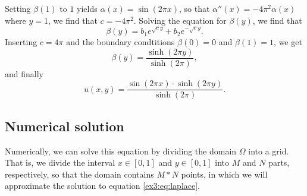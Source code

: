 Setting $\beta(1)$ to $1$ yields $\alpha(x) = \sin(2\pi x)$, so that $\alpha''(x) = -4\pi^2\alpha(x)$ where $y = 1$, we find that $c = -4\pi^2$.
Solving the equation for $\beta(y)$, we find that
\begin{equation*}
    \beta(y) = b_1 e^{\sqrt{c} y} + b_2 e^{-\sqrt{c} y}.
\end{equation*}
Inserting $c = 4\pi$ and the boundary condtitions $\beta(0) = 0$ and $\beta(1) = 1$, we get
\begin{equation*}
    \beta(y) = \frac{\sinh(2\pi y)}{\sinh(2\pi)},
\end{equation*}
and finally
\begin{equation*}
    u(x,y) = \frac{\sin(2\pi x) \cdot \sinh(2\pi y)}{\sinh(2\pi)}.
\end{equation*}

\subsection{Numerical solution}

Numerically, we can solve this equation by dividing the domain $\Omega$ into a grid.
That is, we divide the interval $x \in [0,1]$ and $y \in [0,1]$ into $M$ and $N$ parts, respectively, so that the domain contains $M * N$ points, in which we will approximate the solution to equation \ref{ex3:eq:laplace}.

